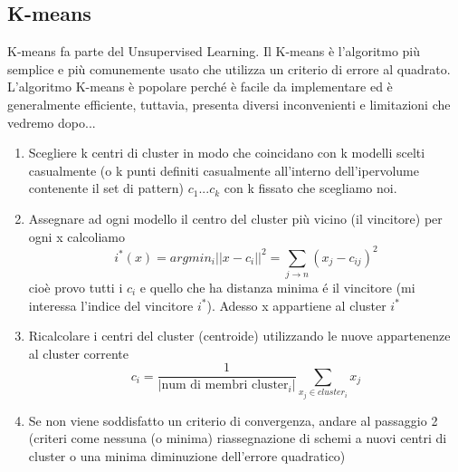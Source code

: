 \documentclass{article}
\begin{document}
\subsection{K-means}
K-means fa parte del Unsupervised Learning. Il K-means è l'algoritmo più semplice e più comunemente usato che utilizza un criterio di errore al quadrato. L'algoritmo K-means è popolare perché è facile da implementare ed è generalmente efficiente, tuttavia, presenta diversi inconvenienti e limitazioni che vedremo dopo...
\begin{enumerate}
    \item Scegliere k centri di cluster in modo che coincidano con k modelli scelti casualmente (o k punti definiti casualmente all'interno dell'ipervolume contenente il set di pattern) \newline
    $c_1...c_k$ con k fissato che scegliamo noi.
    \item Assegnare ad ogni modello il centro del cluster più vicino (il vincitore) \newline
    per ogni x calcoliamo
    \[i^*(x)=argmin_i||x-c_i||^2=\sum_{j\rightarrow n}(x_j-c_{ij})^2\]
    cioè provo tutti i $c_i$ e quello che ha distanza minima é il vincitore (mi interessa l'indice del vincitore $i^*$). Adesso x appartiene al cluster $i^*$
    \item Ricalcolare i centri del cluster (centroide) utilizzando le nuove appartenenze al cluster corrente
    \[c_i=\frac{1}{|\text{num di membri cluster}_{i}|}\sum_{x_j \in cluster_i}x_j\]
    \item Se non viene soddisfatto un criterio di convergenza, andare al passaggio 2 (criteri come nessuna (o minima) riassegnazione di schemi a nuovi centri di cluster o una minima diminuzione dell'errore quadratico)
\end{enumerate}
\end{document}
